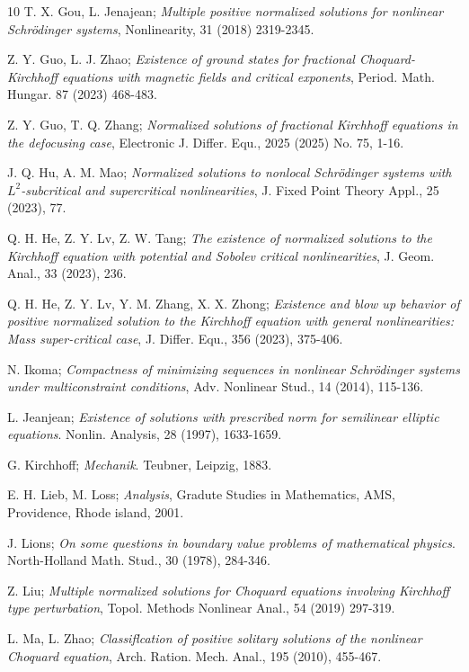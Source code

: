\documentclass[reqno]{amsart}
\begin{document}
\begin{thebibliography}{10}
 T. X. Gou, L. Jenajean;
\emph{Multiple positive normalized solutions for nonlinear Schr\"{o}dinger systems},
Nonlinearity, 31 (2018) 2319-2345.

 Z. Y. Guo, L. J. Zhao;
\emph{Existence of ground states for fractional Choquard-Kirchhoff
equations with magnetic fields and critical exponents}, 
Period. Math. Hungar. 87 (2023) 468-483.

 Z. Y. Guo, T. Q. Zhang;
\emph{Normalized solutions of fractional Kirchhoff equations in the
defocusing case}, Electronic J. Differ. Equ., 2025 (2025) No. 75, 1-16.

 J. Q. Hu, A. M. Mao;
\emph{Normalized solutions to nonlocal Schr\"{o}dinger systems with $L^2$-subcritical
 and supercritical nonlinearities}, J. Fixed Point Theory Appl., 25 (2023), 77.

 Q. H. He, Z. Y. Lv, Z. W. Tang;
\emph{The existence of normalized solutions to the Kirchhoff equation with potential 
and Sobolev critical nonlinearities}, J. Geom. Anal., 33 (2023), 236.

 Q. H. He, Z. Y. Lv, Y. M. Zhang, X. X. Zhong;
\emph{Existence and blow up behavior of positive normalized solution to the Kirchhoff
 equation with general nonlinearities:  Mass super-critical case},
  J. Differ. Equ., 356 (2023), 375-406.

 N. Ikoma;
\emph{Compactness of minimizing sequences in nonlinear Schr\"{o}dinger systems under
multiconstraint conditions}, Adv. Nonlinear Stud., 14 (2014), 115-136.

 L. Jeanjean;
\emph{Existence of solutions with prescribed norm for semilinear elliptic equations}.
Nonlin. Analysis, 28 (1997), 1633-1659.

 G. Kirchhoff;
\emph{Mechanik}. Teubner, Leipzig, 1883.

 E. H. Lieb, M. Loss;
\emph{Analysis}, Gradute Studies in Mathematics, AMS, Providence, Rhode island,
2001.

 J. Lions;
\emph{On some questions in boundary value problems of mathematical physics}. 
North-Holland Math. Stud., 30 (1978), 284-346.

 Z. Liu;
\emph{Multiple normalized solutions for Choquard equations involving Kirchhoff type 
perturbation}, Topol. Methods Nonlinear Anal., 54 (2019) 297-319.

 L. Ma, L. Zhao;
\emph{Classiflcation of positive solitary solutions of the nonlinear Choquard equation},
 Arch. Ration. Mech. Anal., 195 (2010), 455-467.


\end{thebibliography}
\end{document}
